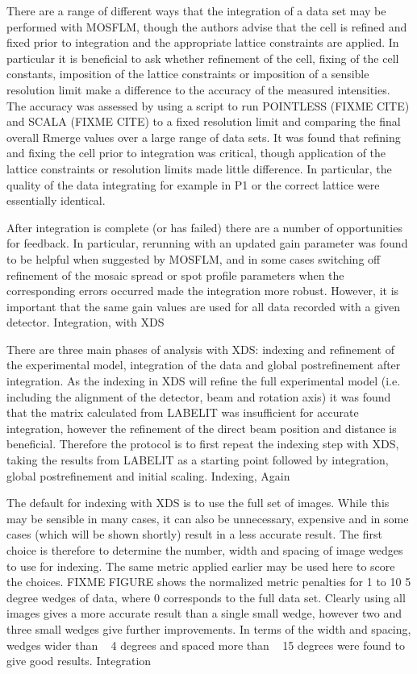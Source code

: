 There are a range of different ways that the integration of a data set may be performed with MOSFLM, though the authors advise that the cell is refined and fixed prior to integration and the appropriate lattice constraints are applied. In particular it is beneficial to ask whether refinement of the cell, fixing of the cell constants, imposition of the lattice constraints or imposition of a sensible resolution limit make a difference to the accuracy of the measured intensities. The accuracy was assessed by using a script to run POINTLESS (FIXME CITE) and SCALA (FIXME CITE) to a fixed resolution limit and comparing the final overall Rmerge values over a large range of data sets. It was found that refining and fixing the cell prior to integration was critical, though application of the lattice constraints or resolution limits made little difference. In particular, the quality of the data integrating for example in P1 or the correct lattice were essentially identical.

After integration is complete (or has failed) there are a number of opportunities for feedback. In particular, rerunning with an updated gain parameter was found to be helpful when suggested by MOSFLM, and in some cases switching off refinement of the mosaic spread or spot profile parameters when the corresponding errors occurred made the integration more robust. However, it is important that the same gain values are used for all data recorded with a given detector.
Integration, with XDS

There are three main phases of analysis with XDS: indexing and refinement of the experimental model, integration of the data and global postrefinement after integration. As the indexing in XDS will refine the full experimental model (i.e. including the alignment of the detector, beam and rotation axis) it was found that the matrix calculated from LABELIT was insufficient for accurate integration, however the refinement of the direct beam position and distance is beneficial. Therefore the protocol is to first repeat the indexing step with XDS, taking the results from LABELIT as a starting point followed by integration, global postrefinement and initial scaling. 
Indexing, Again

The default for indexing with XDS is to use the full set of images. While this may be sensible in many cases, it can also be unnecessary, expensive and in some cases (which will be shown shortly) result in a less accurate result. The first choice is therefore to determine the number, width and spacing of image wedges to use for indexing. The same metric applied earlier may be used here to score the choices. FIXME FIGURE shows the normalized metric penalties for 1 to 10 5 degree wedges of data, where 0 corresponds to the full data set. Clearly using all images gives a more accurate result than a single small wedge, however two and three small wedges give further improvements. In terms of the width and spacing, wedges wider than ~ 4 degrees and spaced more than ~ 15 degrees were found to give good results.
Integration

